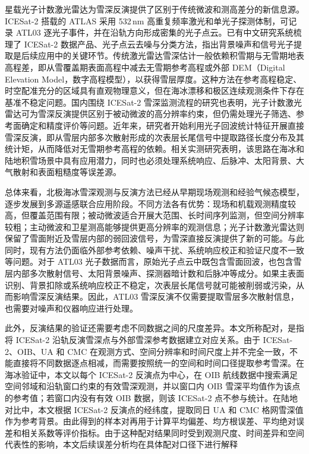 \begin{sloppypar}
星载光子计数激光雷达为雪深反演提供了区别于传统微波和测高差分的新信息源。ICESat-2 搭载的 ATLAS 采用 532\,nm 高重复频率激光和单光子探测体制，可记录 ATL03 逐光子事件，并在沿轨方向形成密集的光子点云\citep{ICESat2_GSFC}。已有中文研究系统梳理了 ICESat-2 数据产品、光子点云去噪与分类方法，指出背景噪声和信号光子提取是后续应用中的关键环节\citep{Zhu2020_ICESat2_ATLAS_Review}。传统激光雷达雪深估计一般依赖积雪期与无雪期地表高程差，即从雪覆盖期表面高程中减去无雪期参考高程或外部 DEM（Digital Elevation Model，数字高程模型），以获得雪层厚度\citep{DeschampsBerger2023_SnowDepth_ICESat2}。这种方法在参考高程稳定、时空配准充分的区域具有直观物理意义，但在海冰漂移和极区连续观测条件下存在基准不稳定问题。国内围绕 ICESat-2 雪深监测流程的研究也表明，光子计数激光雷达可为雪深反演提供区别于被动微波的高分辨率约束，但仍需处理光子筛选、参考面确定和精度评价等问题\citep{lixubing2022icesat2snow}。近年来，研究者开始利用光子回波统计特征开展直接雪深反演，即从雪层内部多次散射形成的次表层长尾信号中提取路径长度分布及其统计矩，从而降低对无雪期参考高程的依赖\citep{Hu2022,Lu2022_DerivingSnowDepth}。相关实测研究表明，该思路在海冰和陆地积雪场景中具有应用潜力，同时也必须处理系统响应、后脉冲、太阳背景、大气散射和表面粗糙度等误差源\citep{Lu2022Unc}。
\end{sloppypar}

总体来看，北极海冰雪深观测与反演方法已经从早期现场观测和经验气候态模型，逐步发展到多源遥感联合应用阶段。不同方法各有优势：现场和机载观测精度较高，但覆盖范围有限；被动微波适合开展大范围、长时间序列监测，但空间分辨率较粗；主动微波和卫星测高能够提供更高分辨率的观测信息；光子计数激光雷达则保留了雪面附近及雪层内部的弱回波信号，为雪深直接反演提供了新的可能。与此同时，现有方法仍面临外部参考依赖、噪声干扰、系统响应校正和验证尺度不一致等问题。对于 ATL03 光子数据而言，原始光子点云中既包含雪面回波，也包含雪层内部多次散射信号、太阳背景噪声、探测器暗计数和后脉冲等成分。如果主表面识别、背景扣除或系统响应校正不稳定，次表层长尾信号就可能被削弱或污染，从而影响雪深反演结果。因此，ATL03 雪深反演不仅需要提取雪层多次散射信息，也需要对噪声和仪器响应进行处理。

此外，反演结果的验证还需要考虑不同数据之间的尺度差异。本文所称配对，是指将 ICESat-2 沿轨反演雪深点与外部雪深参考数据建立对应关系。由于 ICESat-2、OIB、UA 和 CMC 在观测方式、空间分辨率和时间尺度上并不完全一致，不能直接将不同数据逐点相减，而需要按照统一的空间和时间口径提取参考雪深。在海冰验证中，本文以每个 ICESat-2 反演点为中心，在 OIB 航线数据中搜索满足空间邻域和沿轨窗口约束的有效雪深观测，并以窗口内 OIB 雪深平均值作为该点的参考值；若窗口内没有有效 OIB 数据，则该 ICESat-2 点不参与统计。在陆地对比中，本文根据 ICESat-2 反演点的经纬度，提取同日 UA 和 CMC 格网雪深值作为参考背景。由此得到的样本对再用于计算平均偏差、均方根误差、平均绝对误差和相关系数等评价指标。由于这种配对结果同时受到观测尺度、时间差异和空间代表性的影响，本文后续误差分析均在具体配对口径下进行解释

